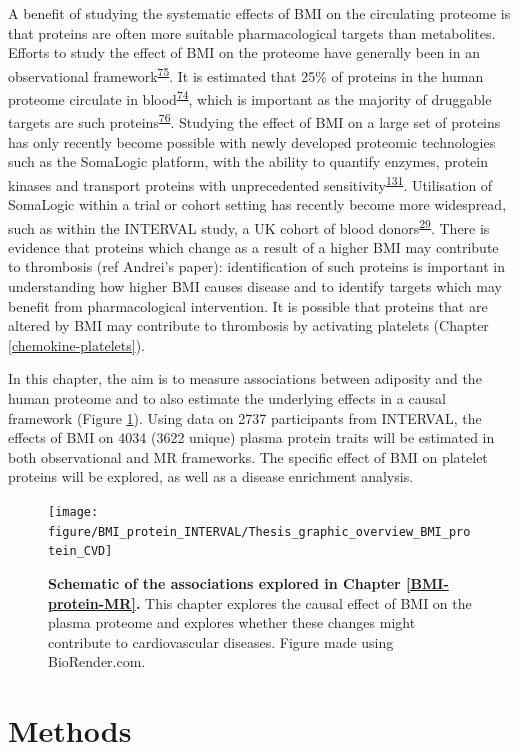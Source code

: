 \documentclass[11pt,twoside]{bristolthesis}
\begin{document}
A benefit of studying the systematic effects of BMI on the circulating proteome is that proteins are often more suitable pharmacological targets than metabolites. Efforts to study the effect of BMI on the proteome have generally been in an observational framework\textsuperscript{\protect\hyperlink{ref-Cominetti2018}{75}}. It is estimated that 25\% of proteins in the human proteome circulate in blood\textsuperscript{\protect\hyperlink{ref-Gold2012}{74}}, which is important as the majority of druggable targets are such proteins\textsuperscript{\protect\hyperlink{ref-Imming2006}{76}}. Studying the effect of BMI on a large set of proteins has only recently become possible with newly developed proteomic technologies such as the SomaLogic platform, with the ability to quantify enzymes, protein kinases and transport proteins with unprecedented sensitivity\textsuperscript{\protect\hyperlink{ref-Rohloff2014}{131}}. Utilisation of SomaLogic within a trial or cohort setting has recently become more widespread, such as within the INTERVAL study, a UK cohort of blood donors\textsuperscript{\protect\hyperlink{ref-Sun2018}{29}}. There is evidence that proteins which change as a result of a higher BMI may contribute to thrombosis (ref Andrei's paper): identification of such proteins is important in understanding how higher BMI causes disease and to identify targets which may benefit from pharmacological intervention. It is possible that proteins that are altered by BMI may contribute to thrombosis by activating platelets (Chapter \ref{chemokine-platelets}).

In this chapter, the aim is to measure associations between adiposity and the human proteome and to also estimate the underlying effects in a causal framework (Figure \ref{fig:BMI-protein-graphic-INT}). Using data on 2737 participants from INTERVAL, the effects of BMI on 4034 (3622 unique) plasma protein traits will be estimated in both observational and MR frameworks. The specific effect of BMI on platelet proteins will be explored, as well as a disease enrichment analysis.



\begin{figure}
\texttt{[image: figure/BMI\_protein\_INTERVAL/Thesis\_graphic\_overview\_BMI\_protein\_CVD]} \caption[Schematic of the associations explored in /\textsuperscript{\protect\hyperlink{ref-ref}{\textbf{ref?}}}(BMI-protein-MR).]{\textbf{Schematic of the associations explored in Chapter \ref{BMI-protein-MR}.} This chapter explores the causal effect of BMI on the plasma proteome and explores whether these changes might contribute to cardiovascular diseases. Figure made using BioRender.com.}\label{fig:BMI-protein-graphic-INT}
\end{figure}
\hypertarget{methods-2}{%
\section{Methods}\label{methods-2}}
\end{document}
